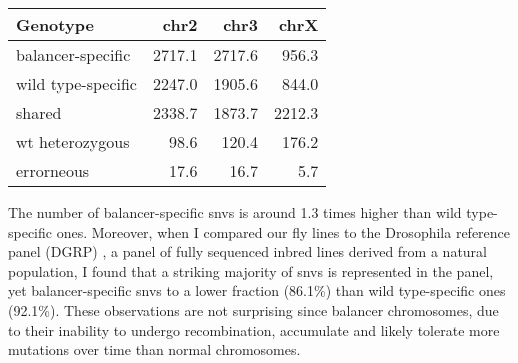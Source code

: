 \begin{table}[ht]
    \centering
    \begin{tabu}{lrrr}
        \toprule
        Genotype & \ac{chr2} & \ac{chr3} & \ac{chrX} \\
        \midrule
        balancer-specific  & 2717.1 & 2717.6 &  956.3 \\
        wild type-specific & 2247.0 & 1905.6 &  844.0 \\
        shared             & 2338.7 & 1873.7 & 2212.3 \\
        wt heterozygous    &   98.6 &  120.4 &  176.2 \\
        errorneous         &   17.6 &   16.7 &    5.7 \\
        \bottomrule
    \end{tabu}
\end{table}

The number of balancer-specific \acp{snv} is around 1.3 times higher than wild
type-specific ones. Moreover, when I compared our fly lines to the Drosophila
reference panel (DGRP) \citep{Mackay2012,Huang2014}, a panel of fully sequenced
inbred  lines derived from a natural population, I
found that a striking majority of \acp{snv} is represented in the panel, yet
balancer-specific \acp{snv} to a lower fraction (86.1\%) than wild type-specific
ones (92.1\%). These observations are not surprising since balancer chromosomes,
due to their inability to undergo recombination, accumulate and likely tolerate
more mutations over time than normal chromosomes.

